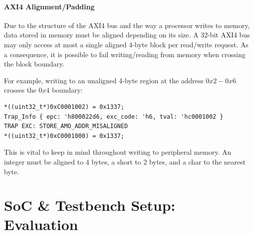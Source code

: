 \documentclass[a4paper,8pt]{report}
\begin{document}

\subsubsection{AXI4 Alignment/Padding}
Due to the structure of the AXI4 bus and the way a processor writes to memory,
data stored in memory must be aligned depending on its size.
A 32-bit AXI4 bus may only access at most a single aligned
4-byte block per read/write request. As a consequence, it is possible to fail
writing/reading from memory when crossing the block boundary.

For example, writing to an unaligned 4-byte region at the address $0x2-0x6$ crosses
the $0x4$ boundary:
\begin{verbatim}
*((uint32_t*)0xC0001002) = 0x1337;
Trap_Info { epc: 'h800022d6, exc_code: 'h6, tval: 'hc0001002 }
TRAP EXC: STORE_AMO_ADDR_MISALIGNED
*((uint32_t*)0xC0001000) = 0x1337;
\end{verbatim}

This is vital to keep in mind throughout writing to peripheral memory. An
integer must be aligned to 4 bytes, a short to 2 bytes, and a char to the
nearest byte. 




\chapter{SoC \& Testbench Setup: Evaluation}
\end{document}
